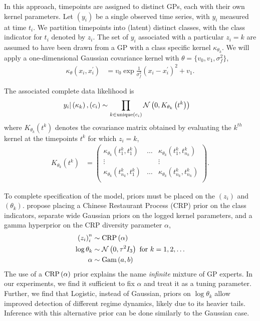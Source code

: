 In this approach, timepoints are assigned to distinct GPs, each with their own
kernel parameters. Let $\left(y_{i}\right)$ be a single observed time series,
with $y_{i}$ measured at time $t_{i}$. We partition timepoints into (latent)
distinct classes, with the class indicator for $t_i$ denoted by $z_i$. The set
of $y_i$ associated with a particular $z_i = k$ are assumed to have been drawn
from a GP with a class specific kernel $\kappa_{\theta_k}$. We will apply a
one-dimensional Gaussian covariance kernel with $\theta = \{v_0, v_1, \sigma_f^2\}$,
\begin{align*}
  \kappa_\theta\left(x_i, x_i^\prime\right) &= v_0 \exp{\frac{1}{\sigma_f^2} \left(x_i - x_i^\prime\right)^2} + v_1.
\end{align*}

The associated complete data likelihood is
\begin{align*}
 y_i \vert \left(\kappa_k\right), \left(c_i\right) &\sim \prod_{k \in \text{unique}\left(c_i\right)} \mathcal{N}\left(0, K_{\theta_k}\left(t^k\right)\right)
\end{align*}
where $K_{\theta_k}\left(t^k\right)$ denotes the covariance matrix obtained by
evaluating the $k^{th}$ kernel at the timepoints $t^k$ for which $z_i = k$,
\begin{align*}
  K_{\theta_k}\left(t^k\right) &= \begin{pmatrix}
    \kappa_{\theta_k}\left(t^k_1, t^k_1\right) & \dots  & \kappa_{\theta_k}\left(t^k_1, t^k_{n_k}\right) \\
    \vdots & & \vdots \\
    \kappa_{\theta_k}\left(t^k_{n_k}, t^k_1\right) & \dots  & \kappa_{\theta_k}\left(t^k_{n_k}, t^k_{n_k}\right) \\
  \end{pmatrix}.
\end{align*}

To complete specification of the model, priors must be placed on the
$\left(z_i\right)$ and $\left(\theta_k\right)$. \cite{rasmussen2002infinite}
propose placing a Chinese Restaurant Process (CRP) prior on the class indicators,
separate wide Gaussian priors on the logged kernel parameters, and a gamma
hyperprior on the CRP diversity parameter $\alpha$,
\begin{align*}
  \left(z_i\right)_i^n &\sim \textnormal{CRP}\left(\alpha\right) \\
  \log \theta_k &\sim \mathcal{N}\left(0, \tau^2 I_3\right) \text{ for } k = 1, 2, \dots \\
  \alpha &\sim \textnormal{Gam}\left(a, b\right)
\end{align*}
The use of a $\textnormal{CRP}\left(\alpha\right)$ prior explains the name \textit{infinite}
mixture of GP experts. In our experiments, we find it sufficient to fix $\alpha$
and treat it as a tuning parameter. Further, we find that Logistic, instead of
Gaussian, priors on $\log \theta_k$ allow improved detection of different regime
dynamics, likely due to its heavier tails. Inference with this alternative prior
can be done similarly to the Gaussian case.

